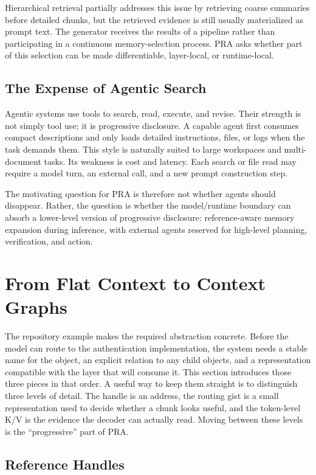 \documentclass[11pt]{article}
\begin{document}
Hierarchical retrieval partially addresses this issue by retrieving coarse summaries before detailed chunks, but the retrieved evidence is still usually materialized as prompt text. The generator receives the results of a pipeline rather than participating in a continuous memory-selection process. PRA asks whether part of this selection can be made differentiable, layer-local, or runtime-local.

\subsection{The Expense of Agentic Search}

Agentic systems use tools to search, read, execute, and revise. Their strength is not simply tool use; it is progressive disclosure. A capable agent first consumes compact descriptions and only loads detailed instructions, files, or logs when the task demands them. This style is naturally suited to large workspaces and multi-document tasks. Its weakness is cost and latency. Each search or file read may require a model turn, an external call, and a new prompt construction step.

The motivating question for PRA is therefore not whether agents should disappear. Rather, the question is whether the model/runtime boundary can absorb a lower-level version of progressive disclosure: reference-aware memory expansion during inference, with external agents reserved for high-level planning, verification, and action.

\section{From Flat Context to Context Graphs}

The repository example makes the required abstraction concrete.  Before the model can
route to the authentication implementation, the system needs a stable name for the
object, an explicit relation to any child objects, and a representation compatible with
the layer that will consume it.  This section introduces those three pieces in that
order.  A useful way to keep them straight is to distinguish three levels of detail.
The handle is an address, the routing gist is a small representation used to decide
whether a chunk looks useful, and the token-level K/V is the evidence the decoder can
actually read.  Moving between these levels is the ``progressive'' part of PRA.

\subsection{Reference Handles}
\end{document}
